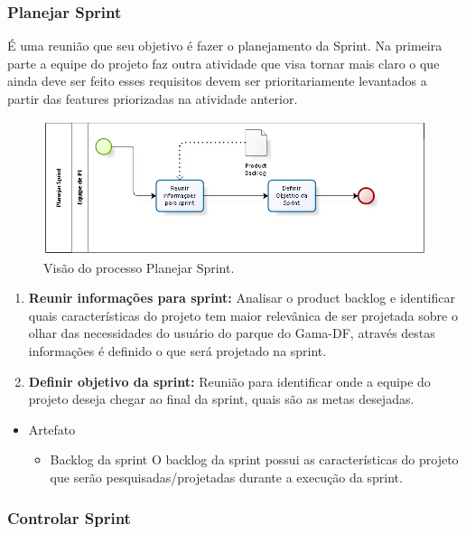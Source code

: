 \subsubsection{Planejar Sprint}

É uma reunião que seu objetivo é fazer o planejamento da Sprint. Na primeira parte a equipe do projeto faz outra atividade que visa tornar mais claro o que ainda deve ser feito esses requisitos devem ser prioritariamente levantados a partir das features priorizadas na atividade anterior.

\begin{figure}[H]
	\centering
	\label{Visão do processo Planejar Sprint}
		\includegraphics[keepaspectratio=true,scale=0.9,angle=360]{processo/planejarSprint.png}
	\caption{Visão do processo Planejar Sprint.}
\end{figure}

\begin{enumerate}
	\item \textbf{Reunir informações para sprint:} 
	Analisar o product backlog e identificar quais características do projeto tem maior relevânica de ser projetada sobre o olhar das necessidades do usuário do parque do Gama-DF, através destas informações é definido o que será projetado na sprint. 
	\item \textbf{Definir objetivo da sprint:} 
	Reunião para identificar onde a equipe do projeto deseja chegar ao final da sprint, quais são as metas desejadas. 
\end{enumerate}

\begin{itemize}
	\item Artefato
	\begin{itemize}
		\item Backlog da sprint
		O backlog da sprint possui as características do projeto que serão pesquisadas/projetadas durante a execução da sprint. 
	\end{itemize}
\end{itemize}


\subsubsection{Controlar Sprint}


